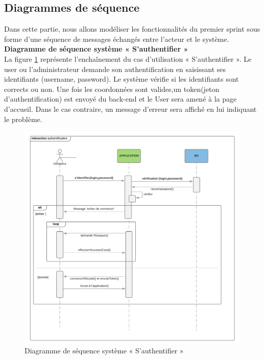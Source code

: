 \subsection{Diagrammes de séquence}
Dans cette partie, nous allons modéliser les fonctionnalités du premier sprint sous forme d’une séquence de messages échangés entre l’acteur et le système.\\
\textbf{Diagramme de séquence système « S’authentifier »}\\
La figure \ref{séqAuth} représente l’enchaînement du cas d’utilisation « S’authentifier ». Le user ou l'administrateur demande son authentification en saisissant ses identifiants
(username, password). Le système vérifie si les identifiants sont corrects ou non. Une fois les coordonnées sont valides,un token(jeton d'authentification) est envoyé du back-end et le User sera amené à la page d’accueil. Dans le cas contraire, un message d’erreur sera affiché en lui indiquant le problème.
\begin{figure} [H]
    \centering
         \begin{center}
             \includegraphics [width=15cm,height=11cm] {SprintImage/Diagramme_seq_Auth}
            \caption{Diagramme de séquence système « S’authentifier »}
            \label{séqAuth}
        \end{center}
    \end{figure}
    \newpage

